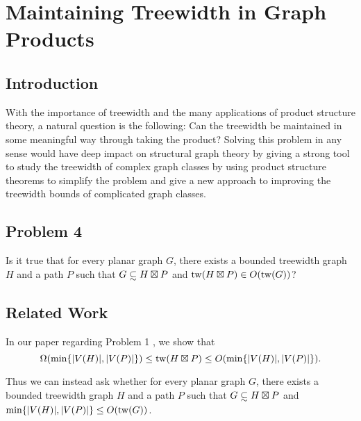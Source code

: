 \documentclass[../main.tex]{subfiles}
\begin{document}
	
	\section{Maintaining Treewidth in Graph Products}
	\subsection{Introduction}
	With the importance of treewidth and the many applications of product structure theory, a natural question is the following: Can the treewidth be maintained in some meaningful way through taking the product? Solving this problem in any sense would have deep impact on structural graph theory by giving a strong tool to study the treewidth of complex graph classes by using product structure theorems to simplify the problem and give a new approach to improving the treewidth bounds of complicated graph classes.
	\subsection{Problem 4}
	  Is it true that for every planar graph $G$, there exists a bounded treewidth graph $H$ and a path $P$ such that $G \subsetsim H\boxtimes P$ and $\operatorname{tw}(H\boxtimes P) \in O(\operatorname{tw}(G))$? 
	
	\subsection{Related Work}
	In our paper regarding Problem 1 \cite[Lemma~3, Equation~(2)]{DMWW24}, we show that $$\Omega(\min\{|V(H)|,|V(P)|\})\leq  \operatorname{tw}( H\boxtimes P) \leq O(\min\{|V(H)|,|V(P)|\}).$$ 
	
	Thus we can instead ask whether for every planar graph $G$, there exists a bounded treewidth graph $H$ and a path $P$ such that $G\subsetsim H\boxtimes P$ and $\min\{|V(H)|,|V(P)|\} \leq O(\operatorname{tw}(G))$. 
	
	
	
\end{document}
